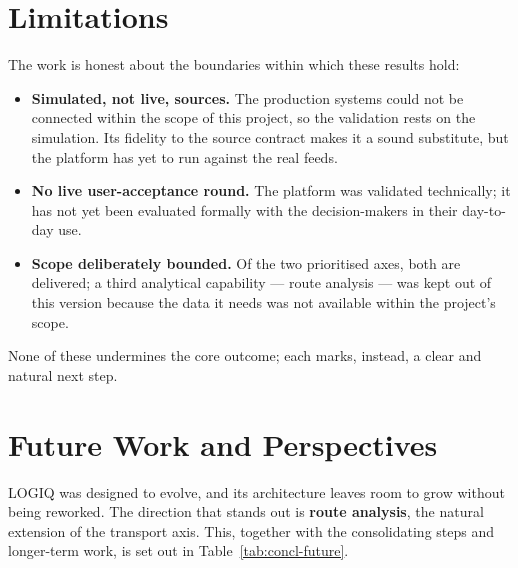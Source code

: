 \section*{Limitations}

The work is honest about the boundaries within which these results hold:

\begin{itemize}[noitemsep]
    \item \textbf{Simulated, not live, sources.} The production systems could not be connected within the
          scope of this project, so the validation rests on the simulation. Its fidelity to the source
          contract makes it a sound substitute, but the platform has yet to run against the real feeds.
    \item \textbf{No live user-acceptance round.} The platform was validated technically; it has not yet
          been evaluated formally with the decision-makers in their day-to-day use.
    \item \textbf{Scope deliberately bounded.} Of the two prioritised axes, both are delivered; a third
          analytical capability --- route analysis --- was kept out of this version because the data it
          needs was not available within the project's scope.
\end{itemize}

None of these undermines the core outcome; each marks, instead, a clear and natural next step.

\section*{Future Work and Perspectives}

LOGIQ was designed to evolve, and its architecture leaves room to grow without being reworked. The
direction that stands out is \textbf{route analysis}, the natural extension of the transport axis.
This, together with the consolidating steps and longer-term work, is set out in
Table~\ref{tab:concl-future}.


